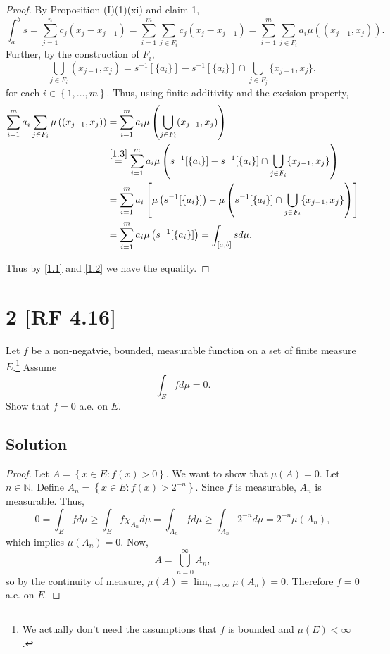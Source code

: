 \documentclass[12pt]{article}
\begin{document}
\begin{proof}
By Proposition (I)(1)(xi) and claim 1,
\begin{equation}
\int_{a}^{b}s = \sum_{j=1}^{n}c_{j}(x_{j} - x_{j-1}) = \sum_{i=1}^{m}\sum_{j\in F_{i}}c_{j}(x_{j} - x_{j-1}) = \sum_{i=1}^{m}\sum_{j\in
F_{i}}a_{i}\mu\left( (x_{j-1},x_{j}) \right).
\label{1.1}
\end{equation}
Further, by the construction of $F_{i}$,
\begin{equation}
\bigcup_{j\in F_{i}}(x_{j-1},x_{j}) = s^{-1}[\{a_{i}\}] - s^{-1}[\{a_{i}\}]\cap \bigcup_{j\in F_{j}}\{x_{j-1},x_{j}\},
\label{1.3}
\end{equation}
for each $i \in \left\{ 1,\hdots, m \right\}$. Thus, using finite additivity and the excision property,
\begin{align}
\sum_{i=1}^{m}a_{i}\sum_{j\in F_{i}} \mu\left( (x_{j-1},x_{j}) \right) & = \sum_{i=1}^{m}a_{i}\mu\left( \bigcup_{j\in F_{i}}(x_{j-1},x_{j}) \right) \nonumber \\
& \stackrel{\eqref{1.3}}{=} \sum_{i=1}^{m}a_{i}\mu\left( s^{-1}[\{a_{i}\}] - s^{-1}[\{a_{i}\}]\cap \bigcup_{j\in F_{i}}\{x_{j-1},x_{j}\} \right) \nonumber \\
& = \sum_{i=1}^{m}a_{i}\left[ \mu\left( s^{-1}[\{a_{i}\}] \right)- \mu\left( s^{-1}[\{a_{i}\}]\cap\bigcup_{j\in F_{i}}\{x_{j-1},x_{j}\} \right)  \right] \nonumber \\
& = \sum_{i=1}^{m}a_{i}\mu\left( s^{-1}[\{a_{i}\}] \right) = \int_{[a,b]}sd\mu. \label{1.2}
\end{align}

Thus by \eqref{1.1} and \eqref{1.2} we have the equality.
\end{proof}


\newpage 
\section*{2 [RF 4.16]}
Let $f$ be a non-negatvie, bounded, measurable function on a set of finite measure $E$.\footnote{We actually don't need the assumptions that $f$ is
bounded and $\mu(E) < \infty$.} Assume 
\[ \int_{E}fd\mu = 0.\] 
Show that $f = 0$ a.e. on $E$.

\subsection*{Solution}
\begin{proof}
Let $A = \left\{ x \in E : f(x) > 0 \right\}$. We want to show that $\mu(A) = 0$. Let $n \in \mathbb{N}$. Define $A_{n} = \left\{ x \in E : f(x) >
2^{-n} \right\}$. Since $f$ is measurable, $A_{n}$ is measurable. Thus,
\[ 0 = \int_{E}fd\mu \geq \int_{E}f\chi_{A_{n}}d\mu = \int_{A_{n}}fd\mu \geq \int_{A_{n}}2^{-n}d\mu = 2^{-n}\mu(A_{n}), \]
which implies $\mu(A_{n}) = 0$. Now, 
\[ A = \bigcup_{n=0}^{\infty}A_{n}, \]
so by the continuity of measure, $\mu(A) = \lim_{n\rightarrow\infty}\mu(A_{n}) = 0$. Therefore $f = 0$ a.e. on $E$.
\end{proof}
\end{document}
